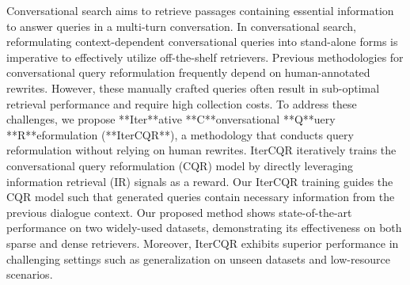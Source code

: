 Conversational search aims to retrieve passages containing essential information to answer queries in a multi-turn conversation.  In conversational search, reformulating context-dependent conversational queries into stand-alone forms is imperative to effectively utilize off-the-shelf retrievers.  Previous methodologies for conversational query reformulation frequently depend on human-annotated rewrites. However, these manually crafted queries often result in sub-optimal retrieval performance and require high collection costs. To address these challenges, we propose **Iter**ative **C**onversational **Q**uery **R**eformulation (**IterCQR**), a methodology that conducts query reformulation without relying on human rewrites.  IterCQR iteratively trains the conversational query reformulation (CQR) model by directly leveraging information retrieval (IR) signals as a reward. Our IterCQR training guides the CQR model such that generated queries contain necessary information from the previous dialogue context. Our proposed method shows state-of-the-art performance on two widely-used datasets, demonstrating its effectiveness on both sparse and dense retrievers.  Moreover, IterCQR exhibits superior performance in challenging settings such as generalization on unseen datasets and low-resource scenarios.